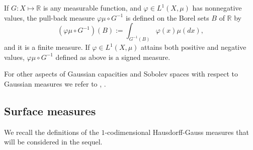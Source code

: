 \documentclass[reqno,twoside,12pt]{amsart}
\begin{document}
 If $G:X\mapsto {\mathbb R}$ is any measurable  function, and $\varphi \in  L^1(X, \mu)$ has nonnegative values, the pull-back measure $\varphi \mu\circ G^{-1}$ is defined on the Borel sets $B$ of  ${\mathbb R}$ by
$$(\varphi \mu\circ G^{-1})(B) := \int_{G^{-1}(B)}\varphi(x) \mu(dx), $$
and it is a finite measure. 
If  $\varphi \in L^1(X, \mu)$ attains both positive and negative values,  $\varphi \mu\circ G^{-1}$ defined as above is a signed measure. 

For other aspects of Gaussian capacities and  Sobolev spaces with respect to Gaussian measures we refer to \cite[Ch. 5]{Boga}, \cite{FP1}. 

\subsection{Surface measures}
\label{Surface measures}

We recall the definitions of the $1$-codimensional Hausdorff-Gauss measures that will be considered in the sequel. 
\end{document}
